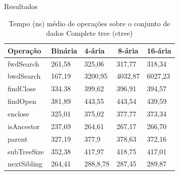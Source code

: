 \begin{frame}{Resultados}
\begin{table}[]
    \centering
    \caption[Tempo médio de operações]{Tempo (ns) médio de operações sobre o conjunto de dados Complete tree (ctree)}
    \begin{tabular}{lllll}
    \hline
    \multicolumn{1}{l}{\textbf{Operação}} & \multicolumn{1}{l}{\textbf{Binária}} & \multicolumn{1}{l}{\textbf{4-ária}} & \multicolumn{1}{c}{\textbf{8-ária}} & \multicolumn{1}{l}{\textbf{16-ária}} \\ \hline
    fwdSearch                               & 261,58                                & 325,06                               & 317,77                               & 318,34                                \\
    \rowcolor[HTML]{EFEFEF} 
    bwdSearch                               & 167,19                                & 3200,95                              & 4032,87                              & 6027,23                               \\
    findClose                               & 334.38                                & 399,62                               & 396,91                               & 394,57                                \\
    \rowcolor[HTML]{EFEFEF} 
    findOpen                                & 381,89                                & 443,55                               & 443,54                               & 439,59                                \\
    enclose                                 & 325,01                                & 375,02                               & 377,77                               & 373,34                                \\
    \rowcolor[HTML]{EFEFEF} 
    isAncestor                              & 237,69                                & 264,61                               & 267,17                               & 266,70                                \\
    parent                                  & 327,19                                & 377,9                                & 378,63                               & 372,16                 \\ 
    \rowcolor[HTML]{EFEFEF} 
    subTreeSize                             & 352,38                                & 417,97                               & 418,75                               & 417,01                                \\
    nextSibling                             & 264,41                                & 288,8,78                             & 287,45                               & 289,87                                \\ \hline            
    \end{tabular}
    \end{table}
\end{frame}


